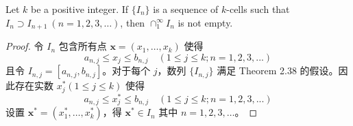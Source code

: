 \documentclass[../poma-notes.tex]{subfiles}
\begin{document}
\begin{theorem}
  Let $k$ be a positive integer. If $\{I_n\}$ is a sequence of $k$-cells such that $I_n \supset I_{n+1} \ (n=1,2,3,\dots)$,
  then $\cap_1^{\infty} I_n$ is not empty.
\end{theorem}

\begin{proof}
  令 $I_n$ 包含所有点 $\mathbf{x} = (x_1,\dots,x_k)$ 使得
  \[a_{n,j} \le x_j \le b_{n,j} \quad (1 \le j \le k; n=1,2,3,...)\]
  且令 $I_{n,j} = [a_{n,j},b_{n,j}]$。对于每个 $j$，数列 $\{I_{n,j}\}$ 满足 Theorem 2.38 的假设。因此存在实数
  $x_j^*(1 \le j \le k)$ 使得
  \[a_{n,j} \le x_j^* \le b_{n,j} \quad (1 \le j \le k; n=1,2,3,...)\]
  设置 $\mathbf{x^*} = (x_1^*, \dots, x_k^*)$，得 $\mathbf{x^*} \in I_n$ 其中 $n=1,2,3,\dots$。
\end{proof}
\end{document}
